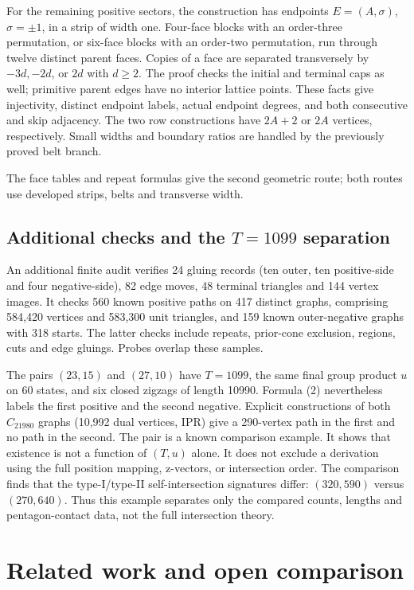 \documentclass[11pt]{amsart}
\begin{document}
For the remaining positive sectors, the construction has endpoints
$E=(A,\sigma)$, $\sigma=\pm1$, in a strip of width one. Four-face
blocks with an order-three permutation, or six-face blocks with an
order-two permutation, run through twelve distinct parent faces.
Copies of a face are separated transversely by $-3d,-2d$, or $2d$
with $d\ge2$. The proof checks the initial and terminal caps as well;
primitive parent edges have no interior lattice points. These facts
give injectivity, distinct endpoint labels, actual endpoint degrees,
and both consecutive and skip adjacency. The two row constructions
have $2A+2$ or $2A$ vertices, respectively. Small widths and boundary
ratios are handled by the previously proved belt branch.

The face tables and repeat formulas give the second geometric route;
both routes use developed strips, belts and transverse width.

\subsection{Additional checks and the \texorpdfstring{$T=1099$}{T=1099} separation}
An additional finite audit verifies 24 gluing records (ten outer,
ten positive-side and four negative-side), 82 edge moves, 48 terminal
triangles and 144 vertex images. It checks 560 known positive paths
on 417 distinct graphs, comprising 584,420 vertices and 583,300 unit
triangles, and 159 known outer-negative graphs with 318 starts.
The latter checks include repeats, prior-cone exclusion, regions,
cuts and edge gluings. Probes overlap these samples.

The pairs $(23,15)$ and $(27,10)$ have $T=1099$, the same
final group product $u$ on 60 states, and six closed zigzags of length
10990. Formula (2) nevertheless labels the first positive and the
second negative. Explicit constructions of both $C_{21980}$ graphs (10,992 dual
vertices, IPR) give a 290-vertex path in the first and no path in the
second. The pair is a known comparison example. It shows that existence is not a function of
$(T,u)$ alone. It does not exclude a derivation using the full position
mapping, z-vectors, or intersection order. The comparison finds that the type-I/type-II self-intersection signatures differ:
$(320,590)$ versus $(270,640)$. Thus this example separates only the
compared counts, lengths and pentagon-contact data, not the full
intersection theory.

\section{Related work and open comparison}\label{sec:review}
\end{document}
